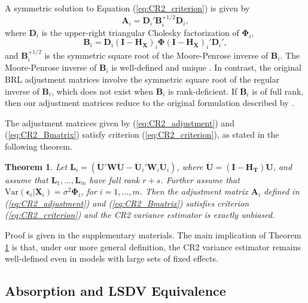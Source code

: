 \documentclass[12pt]{article}
\newtheorem{thm}{Theorem}
\begin{document}
A symmetric solution to Equation (\ref{eq:CR2_criterion}) is given by
\begin{equation}
\label{eq:CR2_adjustment}
\mathbf{A}_i = \mathbf{D}_i' \mathbf{B}_i^{+1/2} \mathbf{D}_i,
\end{equation} where \(\mathbf{D}_i\) is the upper-right triangular
Cholesky factorization of \(\boldsymbol\Phi_i\), \begin{equation}
\label{eq:CR2_Bmatrix}
\mathbf{B}_i = \mathbf{D}_i\left(\mathbf{I} - \mathbf{H_X}\right)_i \boldsymbol\Phi \left(\mathbf{I} - \mathbf{H_X}\right)_i' \mathbf{D}_i',
\end{equation} and \(\mathbf{B}_i^{+1/2}\) is the symmetric square root
of the Moore-Penrose inverse of \(\mathbf{B}_i\). The Moore-Penrose
inverse of \(\mathbf{B}_i\) is well-defined and unique \citep[Thm.
9.18]{Banerjee2014linear}. In contrast, the original BRL adjustment
matrices involve the symmetric square root of the regular inverse of
\(\mathbf{B}_i\), which does not exist when \(\mathbf{B}_i\) is
rank-deficient. If \(\mathbf{B}_i\) is of full rank, then our adjustment
matrices reduce to the original formulation described by
\citet{Bell2002bias}.

The adjustment matrices given by (\ref{eq:CR2_adjustment}) and
(\ref{eq:CR2_Bmatrix}) satisfy criterion (\ref{eq:CR2_criterion}), as
stated in the following theorem.

\begin{thm}
\label{thm:BRL_FE}
Let $\mathbf{L}_i = \left(\mathbf{\ddot{U}}'\mathbf{W}\mathbf{\ddot{U}} - \mathbf{\ddot{U}}_i'\mathbf{W}_i\mathbf{\ddot{U}}_i\right)$, where $\mathbf{\ddot{U}} = \left(\mathbf{I} - \mathbf{H_T}\right)\mathbf{U}$, and assume that $\mathbf{L}_1,...,\mathbf{L}_m$ have full rank $r + s$. Further assume that $\text{Var}\left(\boldsymbol\epsilon_i\left|\mathbf{X}_i\right.\right) = \sigma^2 \boldsymbol\Phi_i$, for $i = 1,...,m$. Then the adjustment matrix $\mathbf{A}_i$ defined in (\ref{eq:CR2_adjustment}) and (\ref{eq:CR2_Bmatrix}) satisfies criterion (\ref{eq:CR2_criterion}) and the CR2 variance estimator is exactly unbiased.
\end{thm}

Proof is given in the supplementary materials. The main implication of
Theorem \ref{thm:BRL_FE} is that, under our more general definition, the
CR2 variance estimator remains well-defined even in models with large
sets of fixed effects.

\hypertarget{absorption-and-lsdv-equivalence}{%
\subsection{Absorption and LSDV
Equivalence}\label{absorption-and-lsdv-equivalence}}
\end{document}
